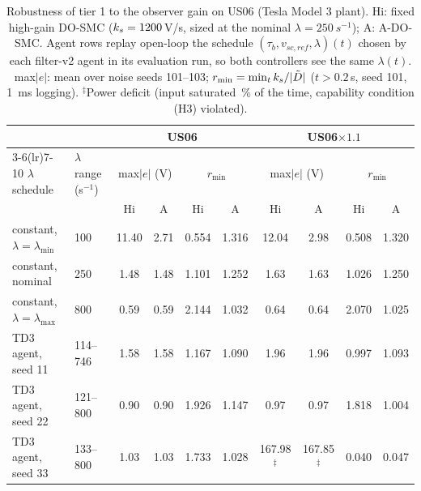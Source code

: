 \begin{table}[t]
\centering\footnotesize\setlength{\tabcolsep}{4pt}
\caption{Robustness of tier 1 to the observer gain on US06 (Tesla Model 3 plant). Hi: fixed high-gain DO-SMC ($k_s=1200$\,V/s, sized at the nominal $\lambda=\SI{250}{s^{-1}}$); A: A-DO-SMC. Agent rows replay open-loop the schedule $(\tau_b,v_{sc,ref},\lambda)(t)$ chosen by each filter-v2 agent in its evaluation run, so both controllers see the same $\lambda(t)$. max$|e|$: mean over noise seeds 101--103; $r_{\min}=\min_t k_s/|\tilde{D}|$ ($t>0.2$\,s, seed 101, \SI{1}{ms} logging). $^\ddagger$Power deficit (input saturated \LamSatPct\,\% of the time, capability condition (H3) violated).}
\label{tab:lambda}
\begin{tabular}{@{}llcccccccc@{}}
\toprule
 & & \multicolumn{4}{c}{US06} & \multicolumn{4}{c}{US06$\times1.1$}\\\cmidrule(lr){3-6}\cmidrule(lr){7-10}
$\lambda$ schedule & $\lambda$ range (s$^{-1}$) & \multicolumn{2}{c}{max$|e|$ (V)} & \multicolumn{2}{c}{$r_{\min}$} & \multicolumn{2}{c}{max$|e|$ (V)} & \multicolumn{2}{c}{$r_{\min}$}\\
 & & Hi & A & Hi & A & Hi & A & Hi & A\\
\midrule
constant, $\lambda=\lambda_{\min}$ & 100 & 11.40 & 2.71 & 0.554 & 1.316 & 12.04 & 2.98 & 0.508 & 1.320\\
constant, nominal & 250 & 1.48 & 1.48 & 1.101 & 1.252 & 1.63 & 1.63 & 1.026 & 1.250\\
constant, $\lambda=\lambda_{\max}$ & 800 & 0.59 & 0.59 & 2.144 & 1.032 & 0.64 & 0.64 & 2.070 & 1.025\\
\midrule
TD3 agent, seed 11 & 114--746 & 1.58 & 1.58 & 1.167 & 1.090 & 1.96 & 1.96 & 0.997 & 1.093\\
TD3 agent, seed 22 & 121--800 & 0.90 & 0.90 & 1.926 & 1.147 & 0.97 & 0.97 & 1.818 & 1.004\\
TD3 agent, seed 33 & 133--800 & 1.03 & 1.03 & 1.733 & 1.028 & 167.98$^\ddagger$ & 167.85$^\ddagger$ & 0.040 & 0.047\\
\bottomrule
\end{tabular}
\end{table}
